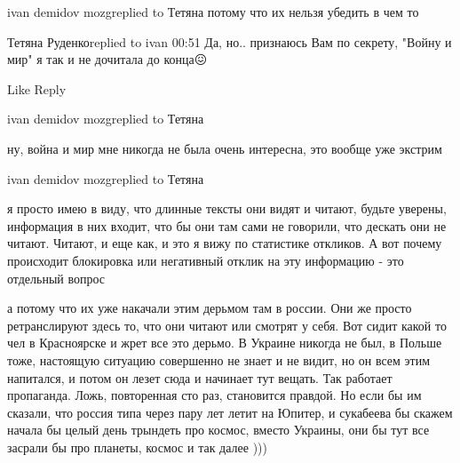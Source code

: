 ivan demidov mozgreplied to Тетяна
потому что их нельзя убедить в чем то

Тетяна Руденкоreplied to ivan
00:51
Да, но.. признаюсь Вам по секрету, "Войну и мир" я так и не дочитала до конца😖

    Like
    Reply

ivan demidov mozgreplied to Тетяна

ну, война и мир мне никогда не была очень интересна, это вообще уже экстрим

ivan demidov mozgreplied to Тетяна

я просто имею в виду, что длинные тексты они видят и читают, будьте уверены,
информация в них входит, что бы они там сами не говорили, что дескать они не
читают. Читают, и еще как, и это я вижу по статистике откликов. А вот почему
происходит блокировка или негативный отклик на эту информацию - это отдельный
вопрос

а потому что их уже накачали этим дерьмом там в россии. Они же просто
ретранслируют здесь то, что они читают или смотрят у себя. Вот сидит какой то
чел в Красноярске и жрет все это дерьмо. В Украине никогда не был, в Польше
тоже, настоящую ситуацию совершенно не знает и не видит, но он всем этим
напитался, и потом он лезет сюда и начинает тут вещать. Так работает
пропаганда. Ложь, повторенная сто раз, становится правдой. Но если бы им
сказали, что россия типа через пару лет летит на Юпитер, и сукабеева бы скажем
начала бы целый день трындеть про космос, вместо Украины, они бы тут все
засрали бы про планеты, космос и так далее )))

